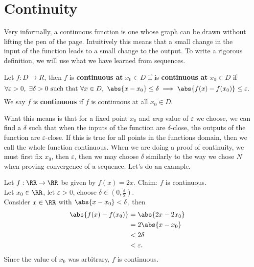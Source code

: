 \documentclass[../real_analysis.tex]{subfiles}
\begin{document}
    \section{Continuity}
        Very informally, a continuous function is one whose graph can be drawn without lifting the pen of the page. Intuitively this means that a small change in the input of the function leads to a small change to the output. To write a rigorous definition, we will use what we have learned from sequences.
        \begin{definition}
            Let $f: D \to R$, then $f$ is \textbf{continuous at} $x_0\in D$ if is \textbf{continuous at} $x_0\in D$ if
            \begin{equation}
                \forall\varepsilon>0,\ \exists\delta>0\text{ such that }\forall x\in D,\ \abs{x-x_0}\leq\delta\implies\abs{f(x)-f(x_0)}\leq\varepsilon.
            \end{equation}
            We say $f$ is \textbf{continuous} if $f$ is continuous at all $x_0\in D$.
        \end{definition}
        What this means is that for a fixed point $x_0$ and \textit{any} value of $\varepsilon$ we choose, we can find a $\delta$ such that when the inputs of the function are $\delta$-close, the outputs of the function are $\varepsilon$-close. If this is true for all points in the functions domain, then we call the whole function continuous.
        When we are doing a proof of continuity, we must first fix $x_0$, then $\varepsilon$, then we may choose $\delta$ similarly to the way we chose $N$ when proving convergence of a sequence. Let's do an example.
        \begin{example}
            Let $f: \RR\to\RR$ be given by $f(x)=2x$.
            Claim: $f$ is continuous.\\
            Let $x_0\in\RR$, let $\varepsilon>0$, choose $\delta\in(0,\frac{\varepsilon}{2})$.\\
            Consider $x\in\RR$ with $\abs{x-x_0}<\delta$, then
            \begin{align}
                \abs{f(x)-f(x_0)}&=\abs{2x-2x_0}\\
                &=2\abs{x-x_0}\\
                &<2\delta\\
                &<\varepsilon.
            \end{align}
            Since the value of $x_0$ was arbitrary, $f$ is continuous.
        \end{example}
\end{document}
